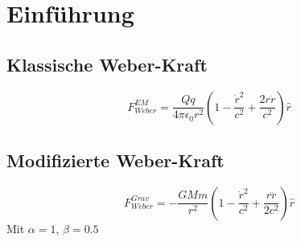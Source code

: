 \section{Einführung}
\subsection*{Klassische Weber-Kraft}
\[ F_{Weber}^{EM} = \frac{Qq}{4\pi\epsilon_0 r^2}\left(1 - \frac{\dot{r}^2}{c^2} + \frac{2r\ddot{r}}{c^2}\right)\hat{r} \]

\subsection*{Modifizierte Weber-Kraft}
\[ F_{Weber}^{Grav} = -\frac{GMm}{r^2}\left(1 - \frac{\dot{r}^2}{c^2} + \frac{r\ddot{r}}{2c^2}\right)\hat{r} \]
Mit $\alpha=1$, $\beta=0.5$